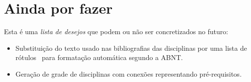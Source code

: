 \documentclass[a4paper, 11pt]{article}
\begin{document}
\begin{PDExample}
\end{PDExample}

\section{Ainda por fazer}
Esta é uma \textit{lista de desejos} que podem ou não ser concretizados no futuro:

\begin{itemize}
    \item Substituição do texto usado nas bibliografias das disciplinas por uma lista de rótulos \BibTeX\ para formatação automática segundo a ABNT.
    \item Geração de grade de disciplinas com conexões representando pré-requisitos.
\end{itemize}

\printindex
\end{document}
